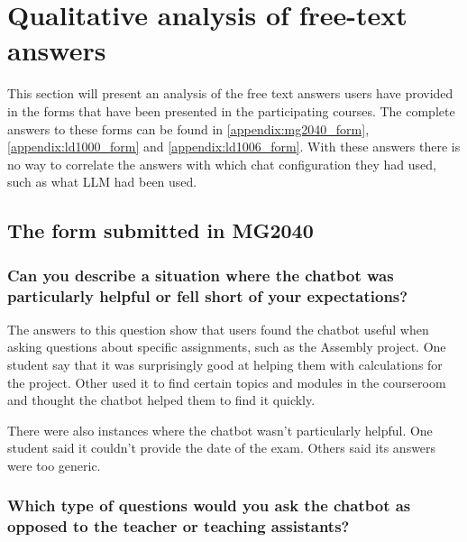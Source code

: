 








\section{Qualitative analysis of free-text answers}
\label{sec:qualitative_analysis_of_user_responses}


This section will present an analysis of the free text answers users have provided in the forms that have been presented in the participating courses. The complete answers to these forms can be found in \autoref{appendix:mg2040_form}, \autoref{appendix:ld1000_form} and \autoref{appendix:ld1006_form}. With these answers there is no way to correlate the answers with which chat configuration they had used, such as what \gls{LLM} had been used.


\subsection{The form submitted in MG2040}


\subsubsection{Can you describe a situation where the chatbot was particularly helpful or fell short of your expectations?}


The answers to this question show that users found the chatbot useful when asking questions about specific assignments, such as the Assembly project. One student say that it was surprisingly good at helping them with calculations for the project. Other used it to find certain topics and modules in the courseroom and thought the chatbot helped them to find it quickly.


There were also instances where the chatbot wasn’t particularly helpful. One student said it couldn’t provide the date of the exam. Others said its answers were too generic.


\subsubsection{Which type of questions would you ask the chatbot as opposed to the teacher or teaching assistants?}



